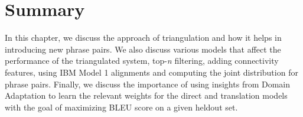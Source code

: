 \section{Summary}
    In this chapter, we discuss the approach of triangulation and how it helps in introducing new phrase pairs. We also discuss various models that affect the performance of the triangulated system, top-\emph{n} filtering, adding connectivity features, using IBM Model 1 alignments and computing the joint distribution for phrase pairs. Finally, we discuss the importance of using insights from Domain Adaptation to learn the relevant weights for the direct and translation models with the goal of maximizing BLEU score on a given heldout set. 


